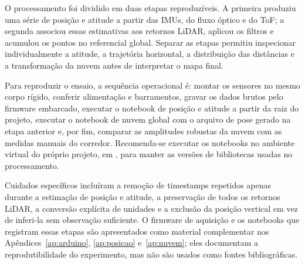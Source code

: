 O processamento foi dividido em duas etapas reproduzíveis. A primeira produziu uma série de posição e atitude a partir das IMUs, do fluxo óptico e do ToF; a segunda associou essas estimativas aos retornos LiDAR, aplicou os filtros e acumulou os pontos no referencial global. Separar as etapas permitiu inspecionar individualmente a atitude, a trajetória horizontal, a distribuição das distâncias e a transformação da nuvem antes de interpretar o mapa final.

Para reproduzir o ensaio, a sequência operacional é: montar os sensores no mesmo corpo rígido, conferir alimentação e barramentos, gravar os dados brutos pelo firmware embarcado, executar o notebook de posição e atitude a partir da raiz do projeto, executar o notebook de nuvem global com o arquivo de pose gerado na etapa anterior e, por fim, comparar as amplitudes robustas da nuvem com as medidas manuais do corredor. Recomenda-se executar os notebooks no ambiente virtual do próprio projeto, em , para manter as versões de bibliotecas usadas no processamento.

Cuidados específicos incluíram a remoção de timestamps repetidos apenas durante a estimação de posição e atitude, a preservação de todos os retornos LiDAR, a conversão explícita de unidades e a exclusão da posição vertical em vez de inferi-la sem observação suficiente. O firmware de aquisição e os notebooks que registram essas etapas são apresentados como material complementar nos Apêndices~\ref{ap:arduino}, \ref{ap:posicao} e~\ref{ap:nuvem}; eles documentam a reprodutibilidade do experimento, mas não são usados como fontes bibliográficas.
